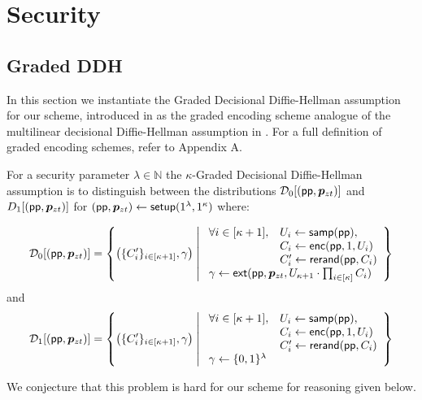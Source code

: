 \section{Security}

\subsection{Graded DDH}
In this section we instantiate the Graded Decisional Diffie-Hellman assumption for our scheme, introduced in \cite{ggh13a} as the graded encoding scheme analogue of the multilinear decisional Diffie-Hellman assumption in \cite{bs}.  For a full definition of graded encoding schemes, refer to Appendix A.

\begin{definition}
\label{kgddh}
For a security parameter $\lambda \in \mathbb{N}$ the $\kappa$-Graded Decisional Diffie-Hellman assumption is to distinguish between the distributions $\mathcal{D}_0[(\mathsf{pp}, \bm{p}_{zt})]$ and $D_1[(\mathsf{pp}, \bm{p}_{zt})]$ for $(\mathsf{pp}, \bm{p}_{zt}) \leftarrow \mathsf{setup}(1^\lambda, 1^\kappa)$ where: 

$$\mathcal{D}_0[(\mathsf{pp}, \pzt)] = \left\{ \left(\{C_i'\}_{i\in [\kappa + 1]}, \gamma \right) \;\middle|\; \begin{array}{ll}
\forall i \in [\kappa + 1], &  U_i \leftarrow \mathsf{samp}(\mathsf{pp}),\\
& C_i \leftarrow \mathsf{enc}(\mathsf{pp}, 1, U_i)\\
& C_i' \leftarrow \mathsf{rerand}(\mathsf{pp}, C_i)\\
\multicolumn{2}{l}{\gamma \leftarrow \mathsf{ext}(\mathsf{pp}, \pzt, U_{\kappa+1} \cdot\prod_{i \in [\kappa]} C_i)}
\end{array}\right\}$$
and
$$\mathcal{D}_1[(\mathsf{pp}, \pzt)] = \left\{ \left(\{C_i'\}_{i\in [\kappa + 1]}, \gamma \right) \;\middle|\; \begin{array}{ll}
\forall i \in [\kappa + 1], &  U_i \leftarrow \mathsf{samp}(\mathsf{pp}),\\
& C_i \leftarrow \mathsf{enc}(\mathsf{pp}, 1, U_i)\\
& C_i' \leftarrow \mathsf{rerand}(\mathsf{pp}, C_i)\\
\multicolumn{2}{l}{\gamma \leftarrow \{0,1\}^\lambda}
\end{array}\right\}$$
\end{definition}

We conjecture that this problem is hard for our scheme for reasoning given below.

